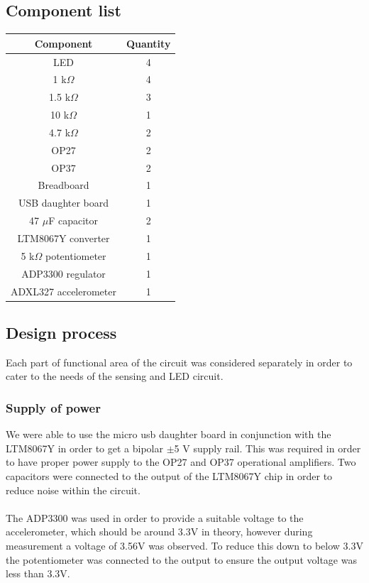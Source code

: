 \documentclass[12pt]{article}
\begin{document}
        \subsection{Component list}
            \begin{tabular}{ |c|c| }
                \hline
                Component & Quantity \\
                \hline
                LED & 4 \\
                \hline
                1 k$\Omega$ & 4 \\
                \hline
                1.5 k$\Omega$ & 3 \\
                \hline
                10 k$\Omega$ & 1 \\
                \hline
                4.7 k$\Omega$ & 2 \\
                \hline
                OP27 & 2 \\
                \hline
                OP37 & 2 \\
                \hline
                Breadboard & 1 \\
                \hline
                USB daughter board & 1 \\
                \hline
                47 $\mu$F capacitor & 2 \\
                \hline
                LTM8067Y converter & 1 \\
                \hline
                5 k$\Omega$ potentiometer & 1 \\
                \hline
                ADP3300 regulator & 1 \\
                \hline
                ADXL327 accelerometer & 1 \\
                \hline
            \end{tabular}
        \subsection{Design process}
            Each part of functional area of the circuit was considered separately in order to cater to the needs of the sensing and LED circuit.
            \subsubsection{Supply of power}
                We were able to use the micro usb daughter board in conjunction with the LTM8067Y in order to get a bipolar $\pm$5 V supply rail. This
                was required in order to have proper power supply to the OP27 and OP37 operational amplifiers. Two capacitors were connected to the output
                of the LTM8067Y chip in order to reduce noise within the circuit. \\ \\
                The ADP3300 was used in order to provide a suitable voltage to the accelerometer, which should be around 3.3V in theory, however during measurement
                a voltage of 3.56V was observed. To reduce this down to below 3.3V the potentiometer was connected to the output to ensure the output voltage was
                less than 3.3V. 
\end{document}
